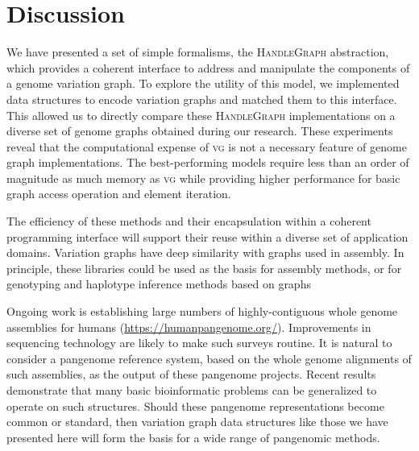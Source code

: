 \documentclass{article}
\begin{document}
\section{Discussion}

We have presented a set of simple formalisms, the \textsc{HandleGraph} abstraction, which provides a coherent interface to address and manipulate the components of a genome variation graph.
To explore the utility of this model, we implemented data structures to encode variation graphs and matched them to this interface.
This allowed us to directly compare these \textsc{HandleGraph} implementations on a diverse set of genome graphs obtained during our research.
These experiments reveal that the computational expense of \textsc{vg} is not a necessary feature of genome graph implementations.
The best-performing models require less than an order of magnitude as much memory as \textsc{vg} while providing higher performance for basic graph access operation and element iteration.

The efficiency of these methods and their encapsulation within a coherent programming interface will support their reuse within a diverse set of application domains.
Variation graphs have deep similarity with graphs used in assembly.
In principle, these libraries could be used as the basis for assembly methods, or for genotyping and haplotype inference methods based on graphs \cite{garg2018graph}

Ongoing work is establishing large numbers of highly-contiguous whole genome assemblies for humans (\url{https://humanpangenome.org/}).
Improvements in sequencing technology are likely to make such surveys routine.
It is natural to consider a pangenome reference system, based on the whole genome alignments of such assemblies, as the output of these pangenome projects.
Recent results demonstrate that many basic bioinformatic problems can be generalized to operate on such structures.
Should these pangenome representations become common or standard, then variation graph data structures like those we have presented here will form the basis for a wide range of pangenomic methods.


\end{document}
